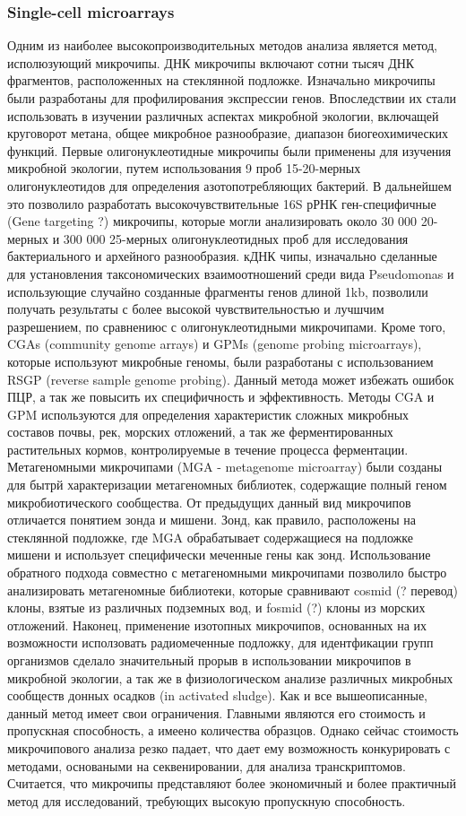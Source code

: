 \subsubsection{Single-cell microarrays}
Одним из наиболее высокопроизводительных методов анализа является метод, исполюзующий микрочипы. ДНК микрочипы включают сотни тысяч ДНК фрагментов, расположенных на стеклянной подложке. Изначально микрочипы были разработаны для профилирования экспрессии генов. Впоследствии их стали использовать в изучении различных
аспектах микробной экологии, включащей круговорот метана, общее микробное разнообразие, диапазон биогеохимических функций. Первые олигонуклеотидные микрочипы были
применены для изучения микробной экологии, путем использования 9 проб 15-20-мерных
олигонуклеотидов для определения азотопотребляющих бактерий. В дальнейшем это позволило разработать высокочувствительные 16S рРНК ген-специфичные (Gene targeting ?)
микрочипы, которые могли анализировать около 30 000 20-мерных и 300 000 25-мерных олигонуклеотидных проб для исследования бактериального и архейного разнообразия. кДНК
чипы, изначально сделанные для установления таксономических взаимоотношений среди
вида Pseudomonas и использующие случайно созданные фрагменты генов длиной 1kb, позволили получать результаты с более высокой чувствительностью и лучшчим разрешением,
по сравнениюс с олигонуклеотидными микрочипами. Кроме того, CGAs (community genome
arrays) и GPMs (genome probing microarrays), которые используют микробные геномы, были
разработаны с использованием RSGP (reverse sample genome probing). Данный метода может
избежать ошибок ПЦР, а так же повысить их специфичность и эффективность. Методы CGA
и GPM используются для определения характеристик сложных микробных составов почвы,
рек, морских отложений, а так же ферментированных растительных кормов, контролируемые в течение процесса ферментации. Метагеномными микрочипами (MGA - metagenome
microarray) были созданы для бытрй характеризации метагеномных библиотек, содержащие полный геном микробиотического сообщества. От предыдущих данный вид микрочипов
отличается понятием зонда и мишени. Зонд, как правило, расположены на стеклянной подложке, где MGA обрабатывает содержащиеся на подложке мишени и использует специфически меченные гены как зонд. Использование обратного подхода совместно с метагеномными
микрочипами позволило быстро анализировать метагеномные библиотеки, которые сравнивают cosmid (? перевод) клоны, взятые из различных подземных вод, и fosmid (?) клоны
из морских отложений. Наконец, применение изотопных микрочипов, основанных на их возможности исползовать радиомеченные подложку, для идентфикации групп организмов сделало значительный прорыв в использовании микрочипов в микробной экологии, а так же
в физиологическом анализе различных микробных сообществ донных осадков (in activated
sludge). Как и все вышеописанные, данный метод имеет свои ограничения. Главными являются его стоимость и пропускная способность, а имеено количества образцов. Однако сейчас
стоимость микрочипового анализа резко падает, что дает ему возможность конкурировать
с методами, основаными на секвенировании, для анализа транскриптомов. Считается, что
микрочипы представляют более экономичный и более практичный метод для исследований,
требующих высокую пропускную способность.

